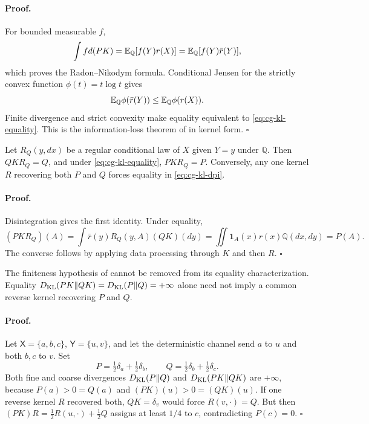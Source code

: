 \paragraph{Proof.}
For bounded measurable \(f\),
\[
\int f d(PK)
=\mathbb E_{\mathbb Q}[f(Y)r(X)]
=\mathbb E_{\mathbb Q}[f(Y)\bar r(Y)],
\]
which proves the Radon--Nikodym formula. Conditional Jensen for the strictly
convex function \(\phi(t)=t\log t\) gives
\[
\mathbb E_{\mathbb Q}\phi(\bar r(Y))
\leq\mathbb E_{\mathbb Q}\phi(r(X)).
\]
Finite divergence and strict convexity make equality equivalent to
\eqref{eq:cg-kl-equality}. This is the information-loss theorem of
\citet{Kullback1951,Csiszar1967} in kernel form. \(\square\)

Let \(R_Q(y,dx)\) be a regular conditional law of \(X\) given \(Y=y\)
under \(\mathbb Q\). Then \(QKR_Q=Q\), and under
\eqref{eq:cg-kl-equality}, \(PKR_Q=P\). Conversely, any one kernel \(R\)
recovering both \(P\) and \(Q\) forces equality in
\eqref{eq:cg-kl-dpi}. 

\paragraph{Proof.}
Disintegration gives the first identity. Under equality,
\[
(PKR_Q)(A)
=\int\bar r(y)R_Q(y,A)(QK)(dy)
=\iint\mathbf1_A(x)r(x)\mathbb Q(dx,dy)
=P(A).
\]
The converse follows by applying data processing through \(K\) and then
\(R\). \(\square\)

The finiteness hypothesis of  cannot be removed from its equality characterization. Equality $D_{\mathrm{KL}}(PK\Vert QK)=D_{\mathrm{KL}}(P\Vert Q)=+\infty$ alone need not imply a common reverse kernel recovering $P$ and $Q$. 

\paragraph{Proof.}
Let $\mathsf X=\{a,b,c\}$, $\mathsf Y=\{u,v\}$, and let the deterministic channel send $a$ to $u$ and both $b,c$ to $v$. Set
\[
P=\tfrac12\delta_a+\tfrac12\delta_b,
\qquad
Q=\tfrac12\delta_b+\tfrac12\delta_c.
\]
Both fine and coarse divergences $D_{\mathrm{KL}}(P\Vert Q)$ and $D_{\mathrm{KL}}(PK\Vert QK)$ are $+\infty$, because $P(a)>0=Q(a)$ and $(PK)(u)>0=(QK)(u)$. If one reverse kernel $R$ recovered both, $QK=\delta_v$ would force $R(v,\cdot)=Q$. But then $(PK)R=\tfrac12R(u,\cdot)+\tfrac12Q$ assigns at least $1/4$ to $c$, contradicting $P(c)=0$. \(\square\)

